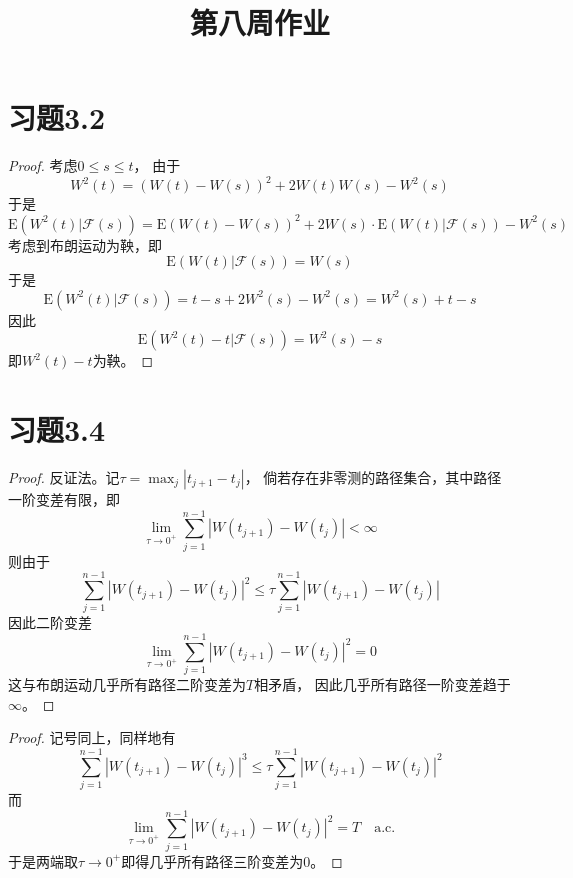 \documentclass[cn]{homework}
\title{第八周作业}
\newcommand{\E}{\mathrm E}
\begin{document}
    \maketitle
    
    \section{习题3.2}
    \newcommand{\filt}{\mathcal F(s)}
    \begin{proof}
        考虑$0\leq s\leq t$，
        由于
        \[W^2(t)=(W(t)-W(s))^2+2W(t)W(s)-W^2(s)\]
        于是
        \[\E(W^2(t)|\filt)=
        \E(W(t)-W(s))^2+2W(s)\cdot\E(W(t)|\filt)-W^2(s)\]
        考虑到布朗运动为鞅，即
        \[\E(W(t)|\filt)=W(s)\]
        于是
        \[\E(W^2(t)|\filt)=t-s+2W^2(s)-W^2(s)=W^2(s)+t-s\]
        因此
        \[\E(W^2(t)-t|\filt)=W^2(s)-s\]
        即$W^2(t)-t$为鞅。
    \end{proof}

    \section{习题3.4}
    \begin{subproblem}
        \newcommand{\gap}{|W(t_{j+1})-W(t_j)|}
        \newcommand{\sumhead}{\sum_{j=1}^{n-1}}
        \newcommand{\limhead}{\lim_{\tau\to0^+}}
        \item
        \begin{proof}
            反证法。记$\tau=\max_j|t_{j+1}-t_j|$，
            倘若存在非零测的路径集合，其中路径
            一阶变差有限，即
            \[\limhead\sumhead\gap<\infty\]
            则由于
            \[\sumhead\gap^2\leq\tau\sumhead\gap\]
            因此二阶变差
            \[\limhead\sumhead\gap^2=0\]
            这与布朗运动几乎所有路径二阶变差为$T$相矛盾，
            因此几乎所有路径一阶变差趋于$\infty$。
        \end{proof}

        \item
        \begin{proof}
            记号同上，同样地有
            \[\sumhead\gap^3\leq\tau\sumhead\gap^2\]
            而
            \[\limhead\sumhead\gap^2=T\quad\text{a.c.}\]
            于是两端取$\tau\to0^+$即得几乎所有路径三阶变差为0。
        \end{proof}
    \end{subproblem}
\end{document}
